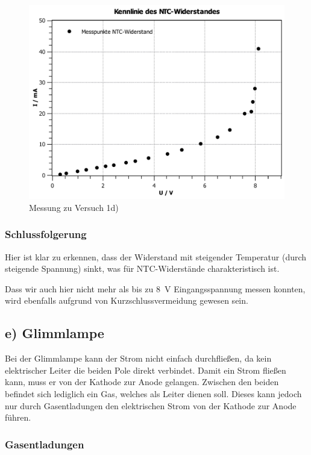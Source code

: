 \documentclass[11pt,a4paper,titlepage, ngerman]{article}
\begin{document}
				\begin{figure}
					\centering
					\includegraphics[width=\textwidth]{KennlinieNTCsubgitter.pdf}
					\caption{Messung zu Versuch 1d)}
					\label{KL d}
				\end{figure}
			
			\subsubsection*{Schlussfolgerung}
			
				Hier ist klar zu erkennen, dass der Widerstand mit steigender Temperatur (durch steigende Spannung) sinkt, was für NTC-Widerstände charakteristisch ist. 
				
				Dass wir auch hier nicht mehr als bis zu \SI{8}{\V} Eingangsspannung messen konnten, wird ebenfalls aufgrund von Kurzschlussvermeidung gewesen sein.
			
		\subsection{e) Glimmlampe} 
			
			Bei der Glimmlampe kann der Strom nicht einfach durchfließen, da kein elektrischer Leiter die beiden Pole direkt verbindet. Damit ein Strom fließen kann, muss er von der Kathode zur Anode gelangen. Zwischen den beiden befindet sich lediglich ein Gas, welches als Leiter dienen soll. Dieses kann jedoch nur durch Gasentladungen den elektrischen Strom von der Kathode zur Anode führen.
			
			\subsubsection*{Gasentladungen}
			
\end{document}

